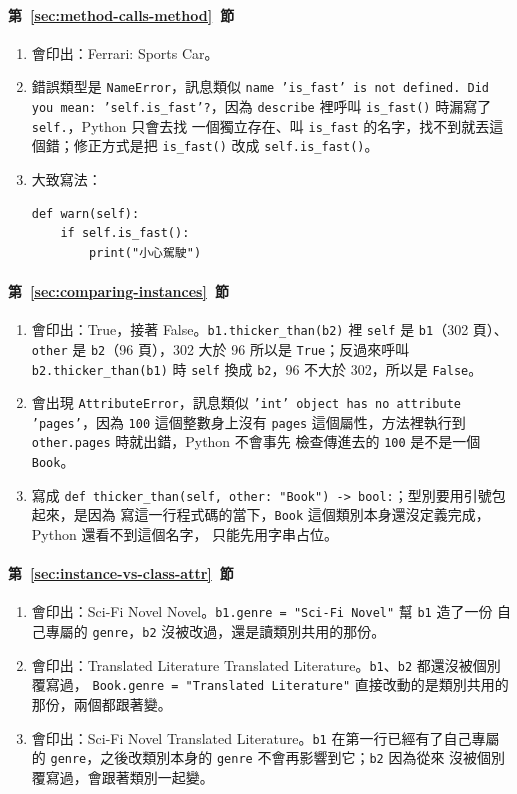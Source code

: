 \paragraph{第~\ref{sec:method-calls-method}~節}
\begin{enumerate}
\item 會印出：Ferrari: Sports Car。
\item 錯誤類型是 \texttt{NameError}，訊息類似
\texttt{name 'is\_fast' is not defined. Did you mean: 'self.is\_fast'?}，因為
\texttt{describe} 裡呼叫 \texttt{is\_fast()} 時漏寫了 \texttt{self.}，Python 只會去找
一個獨立存在、叫 \texttt{is\_fast} 的名字，找不到就丟這個錯；修正方式是把
\texttt{is\_fast()} 改成 \texttt{self.is\_fast()}。
\item 大致寫法：
\begin{verbatim}
def warn(self):
    if self.is_fast():
        print("小心駕駛")
\end{verbatim}
\end{enumerate}

\paragraph{第~\ref{sec:comparing-instances}~節}
\begin{enumerate}
\item 會印出：True，接著 False。\texttt{b1.thicker\_than(b2)} 裡 \texttt{self} 是
\texttt{b1}（302 頁）、\texttt{other} 是 \texttt{b2}（96 頁），302 大於 96 所以是
\texttt{True}；反過來呼叫 \texttt{b2.thicker\_than(b1)} 時 \texttt{self} 換成
\texttt{b2}，96 不大於 302，所以是 \texttt{False}。
\item 會出現 \texttt{AttributeError}，訊息類似
\texttt{'int' object has no attribute 'pages'}，因為 \texttt{100} 這個整數身上沒有
\texttt{pages} 這個屬性，方法裡執行到 \texttt{other.pages} 時就出錯，Python 不會事先
檢查傳進去的 \texttt{100} 是不是一個 \texttt{Book}。
\item 寫成
\texttt{def thicker\_than(self, other: "Book") -> bool:}；型別要用引號包起來，是因為
寫這一行程式碼的當下，\texttt{Book} 這個類別本身還沒定義完成，Python 還看不到這個名字，
只能先用字串占位。
\end{enumerate}

\paragraph{第~\ref{sec:instance-vs-class-attr}~節}
\begin{enumerate}
\item 會印出：Sci-Fi Novel Novel。\texttt{b1.genre = "Sci-Fi Novel"} 幫 \texttt{b1} 造了一份
自己專屬的 \texttt{genre}，\texttt{b2} 沒被改過，還是讀類別共用的那份。
\item 會印出：Translated Literature Translated Literature。\texttt{b1}、\texttt{b2} 都還沒被個別覆寫過，
\texttt{Book.genre = "Translated Literature"} 直接改動的是類別共用的那份，兩個都跟著變。
\item 會印出：Sci-Fi Novel Translated Literature。\texttt{b1} 在第一行已經有了自己專屬的
\texttt{genre}，之後改類別本身的 \texttt{genre} 不會再影響到它；\texttt{b2} 因為從來
沒被個別覆寫過，會跟著類別一起變。
\end{enumerate}
